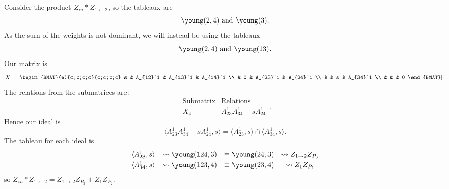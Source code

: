 \documentclass[draft]{article}
\begin{document}
\begin{example}
Consider the product $Z_{in} * Z_{1 \leftarrow 2}$, so the tableaux are
\[
\young(2,4) \text{ and } \young(3).
\]
As the sum of the weights is not dominant, we will instead be using the tableaux
\[
\young(2,4) \text{ and } \young(13).
\]
Our matrix is 
\[
X = \left[\begin{BMAT}(e){c;c;c;c}{c;c;c;c}
     s & A_{12}^1 & A_{13}^1 & A_{14}^1 \\
     & 0 & A_{23}^1 & A_{24}^1 \\
     & & s & A_{34}^1 \\
     & & & 0
\end{BMAT}
\right].
\]
The relations from the submatrices are:
\[
\begin{array}{c|c}
    \text{Submatrix} & \text{Relations} \\ \hline
    X_4 & A_{23}^1A_{34}^1 - sA_{24}^1
\end{array}.
\]
Hence our ideal is 
\[
\langle A_{23}^1A_{34}^1 - sA_{24}^1,s \rangle
= \langle A_{23}^1,s \rangle \cap \langle A_{34}^1,s \rangle.
\]
The tableau for each ideal is
\[\begin{array}{cccc}\vspace{1mm}
    \langle A_{23}^1,s \rangle &\leadsto \young(124,3) &\equiv \young(24,3) &\leadsto Z_{1 \rightarrow 2} Z_{P_3} \\ 
    \langle A_{34}^1,s \rangle &\leadsto \young(123,4) &\equiv \young(23,4) &\leadsto Z_1 Z_{P_2}
\end{array}
\]
so $Z_{in} * Z_{1 \leftarrow 2} = Z_{1 \rightarrow 2} Z_{P_3} + Z_1 Z_{P_2}$.
\end{example}
\end{document}
